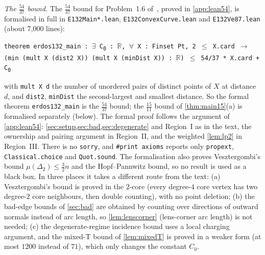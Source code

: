\documentclass[11pt]{amsart}
\theoremstyle{definition}
\theoremstyle{remark}
\newcommand{\R}{\mathbb{R}}
\newcommand{\Dt}{\Delta_2}
\newcommand{\mult}{\mu}
\begin{document}
\emph{The $\frac{54}{37}$ bound.} The $\frac{54}{37}$ bound for Problem~1.6 of~\cite{CDL25}, proved in \cref{app:lean54}, is formalised in full in \texttt{E132Main*.lean}, \texttt{E132ConvexCurve.lean} and \texttt{E132Ve87.lean} (about 7{,}000 lines):
\begin{center}
\texttt{theorem erdos132\_main : $\exists$ C\textsubscript{0} : $\R$, $\forall$ X : Finset Pt, 2 $\le$ X.card $\to$ (min (mult X (dist2 X)) (mult X (minDist X)) : $\R$) $\le$ 54/37 * X.card + C\textsubscript{0}}
\end{center}
with \texttt{mult X d} the number of unordered pairs of distinct points of $X$ at distance $d$, and \texttt{dist2}, \texttt{minDist} the second-largest and smallest distance. So the formal theorem \texttt{erdos132\_main} is the $\frac{54}{37}$ bound; the $\frac{15}{11}$ bound of \cref{thm:main15}(a) is formalised separately (below). The formal proof follows the argument of \cref{app:lean54}: \cref{sec:setup,sec:bad,sec:degenerate} and Region~I as in the text, the ownership and pairing argument in Region~II, and the weighted \cref{lem:lp2} in Region~III. There is no \texttt{sorry}, and \texttt{\#print\allowbreak{} axioms} reports only \texttt{propext}, \texttt{Classical.choice} and \texttt{Quot.sound}. The formalisation also proves Vesztergombi's bound $\mult(\Dt)\le\frac32n$ and the Hopf--Pannwitz bound, so no result is used as a black box. In three places it takes a different route from the text: (a) Vesztergombi's bound is proved in the $2$-core (every degree-$4$ core vertex has two degree-$2$ core neighbours, then double counting), with no point deletion; (b) the bad-edge bounds of \cref{sec:bad} are obtained by counting over directions of outward normals instead of arc length, so \cref{lem:lenscorner} (lens-corner arc length) is not needed; (c) the degenerate-regime incidence bound uses a local charging argument, and the mixed-T bound of \cref{lem:mixedT} is proved in a weaker form (at most $1200$ instead of $71$), which only changes the constant $C_0$.
\end{document}
